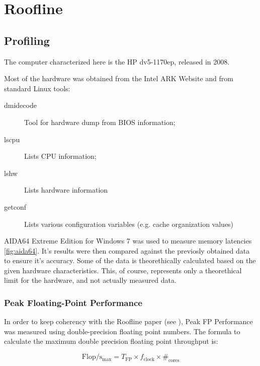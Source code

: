 \documentclass[a4paper,10pt]{report}
\begin{document}
\tableofcontents

\chapter{Roofline}

\section{Profiling}
The computer characterized here is the HP dv5-1170ep, released in 2008.

Most of the hardware was obtained from the Intel ARK Website \cite{ark} and from standard Linux tools:
\begin{description}
\item[dmidecode] Tool for hardware dump from BIOS information;
\item[lscpu] Lists CPU information;
\item[lshw] Lists hardware information
\item[getconf] Lists various configuration variables (e.g. cache organization values)
\end{description}

AIDA64 Extreme Edition for Windows 7 was used to measure memory latencies \autoref{fig:aida64}. It's results were then compared against the previosly obtained data to ensure it's accuracy.
Some of the data is theorethically calculated based on the given hardware characteristics. This, of course, represents only a theorethical limit for the hardware, and not actually measured data.

\subsection{Peak Floating-Point Performance}
In order to keep coherency with the Roofline paper (see \cite{roofline}), Peak FP Performance was measured using double-precision floating point numbers. The formula to calculate the maximum double precision floating point throughput is:

$$\mathrm{Flop/s_{max}} = T_{\mathrm{FP}} \times f_{\mathrm{clock}} \times \#_{\mathrm{cores}}$$
\end{document}
